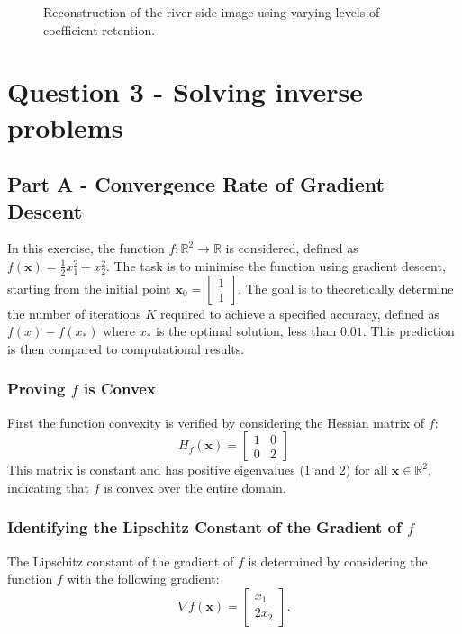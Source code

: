 \documentclass[11pt]{article}
\begin{document}
\begin{figure}[H]
    \caption{Reconstruction of the river side image using varying levels of coefficient retention.}
    \label{fig:thresholded_reconstruction}
\end{figure}

\section{Question 3 - Solving inverse problems}
\subsection{Part A - Convergence Rate of Gradient Descent}
In this exercise, the function $ f : \mathbb{R}^2 \rightarrow \mathbb{R} $ is considered, defined as $ f(\mathbf{x}) = \frac{1}{2} x_1^2 + x_2^2 $. The task is to minimise the function using gradient descent, starting from the initial point $ \mathbf{x}_0 = \begin{bmatrix} 1 \\ 1 \end{bmatrix} $. The goal is to theoretically determine the number of iterations $ K $ required to achieve a specified accuracy, defined as $ f(x) - f(x_*)$ where $x_*$ is the optimal solution, less than $ 0.01 $. This prediction is then compared to computational results.

\subsubsection{Proving \(f \) is Convex}
First the function convexity is verified by considering the Hessian matrix of \( f \): 
\[
H_f(\mathbf{x}) = \begin{bmatrix} 1 & 0 \\ 0 & 2 \end{bmatrix}
\]
This matrix is constant and has positive eigenvalues (1 and 2) for all \( \mathbf{x} \in  \mathbb{R}^2 \), indicating that \( f \) is convex over the entire domain.

\subsubsection{Identifying the Lipschitz Constant of the Gradient of \( f \)}

The Lipschitz constant of the gradient of \( f \) is determined by considering the function \( f \) with the following gradient:
\[
\nabla f(\mathbf{x}) = \begin{bmatrix} x_1 \\ 2x_2 \end{bmatrix}.
\]
\end{document}
